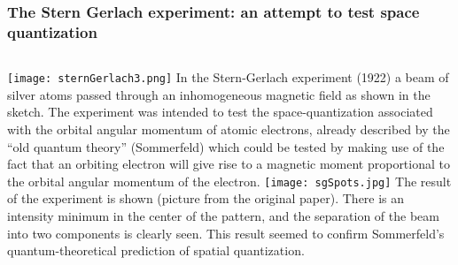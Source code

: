 \begin{frame}
\frametitle{The Stern Gerlach experiment: an attempt to test space quantization}
\begin{columns}
 
\texttt{[image: sternGerlach3.png]}
In the Stern-Gerlach experiment (1922) a beam of silver atoms passed through an inhomogeneous magnetic field as shown in the sketch. The experiment was intended to test the space-quantization associated with the orbital angular momentum of atomic electrons, already described by the ``old quantum theory'' (Sommerfeld) which could be tested by making use of the fact that an orbiting electron will give rise to a magnetic moment proportional to the orbital angular momentum of the electron. 
\texttt{[image: sgSpots.jpg]}
The result of the experiment is shown  (picture from the original paper). There is an intensity minimum in the center of the pattern, and the separation of the beam into two components is clearly seen. This result seemed to confirm Sommerfeld's quantum-theoretical prediction of spatial quantization. 
\end{columns}



\end{frame}